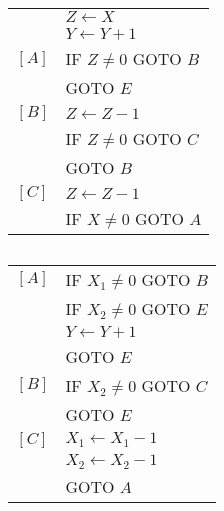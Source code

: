 \subsection{}
\begin{center}
\begin{tabular}{ll}
        & $ Z \gets X $ \\
        & $ Y \gets Y + 1 $ \\
  $[A]$ & IF $Z \neq 0$ GOTO $B$ \\
        & GOTO $E$ \\
  $[B]$ & $ Z \gets Z - 1 $ \\
        & IF $Z \neq 0$ GOTO $C$ \\
        & GOTO $B$ \\
  $[C]$ & $ Z \gets Z - 1 $ \\
        & IF $X \neq 0$ GOTO $A$ \\
\end{tabular}
\end{center}


\subsection{}
\begin{center}
\begin{tabular}{ll}
  $[A]$ & IF $X_{1} \neq 0$ GOTO $B$ \\
        & IF $X_{2} \neq 0$ GOTO $E$ \\
        & $ Y \gets Y + 1 $ \\
        & GOTO $E$ \\
  $[B]$ & IF $X_{2} \neq 0$ GOTO $C$ \\
        & GOTO $E$ \\
  $[C]$ & $ X_{1} \gets X_{1} - 1 $ \\
        & $ X_{2} \gets X_{2} - 1 $ \\
        & GOTO $A$ \\
\end{tabular}
\end{center}


